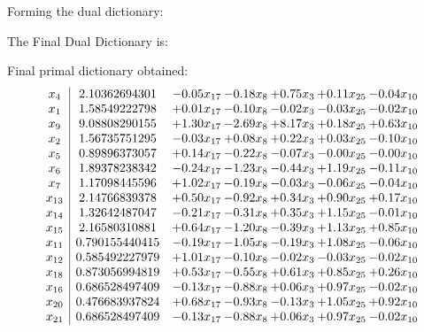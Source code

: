 \documentclass[8pt]{article}
\begin{document}
Forming the dual dictionary:

The Final Dual Dictionary is: 

 Final primal dictionary obtained: 
\[\begin{array}{c| c c@{\hskip 2pt} c@{\hskip 2pt} c@{\hskip 2pt} c@{\hskip 2pt} c@{\hskip 2pt} }
 x_{4}   &  2.10362694301 & -0.05 x_{17} & -0.18 x_{8} & +  0.75 x_{3} & +  0.11 x_{25} & -0.04 x_{10}\\
 x_{1}   &  1.58549222798 & +  0.01 x_{17} & -0.10 x_{8} & -0.02 x_{3} & -0.03 x_{25} & -0.02 x_{10}\\
 x_{9}   &  9.08808290155 & +  1.30 x_{17} & -2.69 x_{8} & +  8.17 x_{3} & +  0.18 x_{25} & +  0.63 x_{10}\\
 x_{2}   &  1.56735751295 & -0.03 x_{17} & +  0.08 x_{8} & +  0.22 x_{3} & +  0.03 x_{25} & -0.10 x_{10}\\
 x_{5}   &  0.89896373057 & +  0.14 x_{17} & -0.22 x_{8} & -0.07 x_{3} & -0.00 x_{25} & -0.00 x_{10}\\
 x_{6}   &  1.89378238342 & -0.24 x_{17} & -1.23 x_{8} & -0.44 x_{3} & +  1.19 x_{25} & -0.11 x_{10}\\
 x_{7}   &  1.17098445596 & +  1.02 x_{17} & -0.19 x_{8} & -0.03 x_{3} & -0.06 x_{25} & -0.04 x_{10}\\
 x_{13}   &  2.14766839378 & +  0.50 x_{17} & -0.92 x_{8} & +  0.34 x_{3} & +  0.90 x_{25} & +  0.17 x_{10}\\
 x_{14}   &  1.32642487047 & -0.21 x_{17} & -0.31 x_{8} & +  0.35 x_{3} & +  1.15 x_{25} & -0.01 x_{10}\\
 x_{15}   &  2.16580310881 & +  0.64 x_{17} & -1.20 x_{8} & -0.39 x_{3} & +  1.13 x_{25} & +  0.85 x_{10}\\
 x_{11}   &  0.790155440415 & -0.19 x_{17} & -1.05 x_{8} & -0.19 x_{3} & +  1.08 x_{25} & -0.06 x_{10}\\
 x_{12}   &  0.585492227979 & +  1.01 x_{17} & -0.10 x_{8} & -0.02 x_{3} & -0.03 x_{25} & -0.02 x_{10}\\
 x_{18}   &  0.873056994819 & +  0.53 x_{17} & -0.55 x_{8} & +  0.61 x_{3} & +  0.85 x_{25} & +  0.26 x_{10}\\
 x_{16}   &  0.686528497409 & -0.13 x_{17} & -0.88 x_{8} & +  0.06 x_{3} & +  0.97 x_{25} & -0.02 x_{10}\\
 x_{20}   &  0.476683937824 & +  0.68 x_{17} & -0.93 x_{8} & -0.13 x_{3} & +  1.05 x_{25} & +  0.92 x_{10}\\
 x_{21}   &  0.686528497409 & -0.13 x_{17} & -0.88 x_{8} & +  0.06 x_{3} & +  0.97 x_{25} & -0.02 x_{10}\\

\end{array}\]
\end{document}
